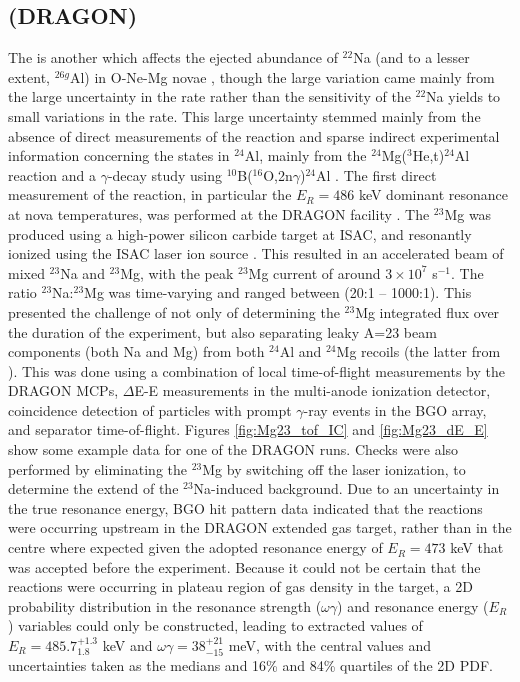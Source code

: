 \subsection{ (DRAGON)}
The  is another which affects the ejected abundance of $^{22}$Na (and to a lesser extent, $^{26g}$Al) in O-Ne-Mg novae \cite{ili02}, though the large variation came mainly from the large uncertainty in the rate rather than the sensitivity of the $^{22}$Na yields to small variations in the rate. This large uncertainty stemmed mainly from the absence of direct measurements of the reaction and sparse indirect experimental information concerning the states in $^{24}$Al, mainly from the $^{24}$Mg($^{3}$He,t)$^{24}$Al reaction \cite{gre91,kub95,vis07,zeg08} and a $\gamma$-decay study using $^{10}$B($^{16}$O,2n$\gamma$)$^{24}$Al \cite{lot08}. 
The first direct measurement of the  reaction, in particular the $E_{R}=486$ keV dominant resonance at nova temperatures, was performed at the DRAGON facility \cite{eri10}. The $^{23}$Mg was produced using a high-power silicon carbide target at ISAC, and resonantly ionized using the ISAC laser ion source \cite{las09}. This resulted in an accelerated beam of mixed $^{23}$Na and $^{23}$Mg, with the peak $^{23}$Mg current of around $3\times10^{7}$ s$^{-1}$. The ratio $^{23}$Na:$^{23}$Mg was time-varying and ranged between (20:1 -- 1000:1). This presented the challenge of not only of determining the $^{23}$Mg integrated flux over the duration of the experiment, but also separating leaky A=23 beam components (both Na and Mg) from both $^{24}$Al and $^{24}$Mg recoils (the latter from ). This was done using a combination of local time-of-flight measurements by the DRAGON MCPs, $\Delta$E-E measurements in the multi-anode ionization detector, coincidence detection of particles with prompt $\gamma$-ray events in the BGO array, and separator time-of-flight. Figures \ref{fig:Mg23_tof_IC} and \ref{fig:Mg23_dE_E} show some example data for one of the DRAGON  runs. Checks were also performed by eliminating the $^{23}$Mg by switching off the laser ionization, to determine the extend of the $^{23}$Na-induced background.  
Due to an uncertainty in the true resonance energy, BGO hit pattern data indicated that the reactions were occurring upstream in the DRAGON extended gas target, rather than in the centre where expected given the adopted resonance energy of $E_{R}=473$ keV that was accepted before the experiment. Because it could not be certain that the reactions were occurring in plateau region of gas density in the target, a 2D probability distribution in the resonance strength ($\omega\gamma$) and resonance energy ($E_{R}$) variables could only be constructed, leading to extracted values of $E_{R}=485.7^{+1.3}_{1.8}$ keV and $\omega\gamma=38^{+21}_{-15}$ meV, with the central values and uncertainties taken as the medians and 16\% and 84\% quartiles of the 2D PDF. 
